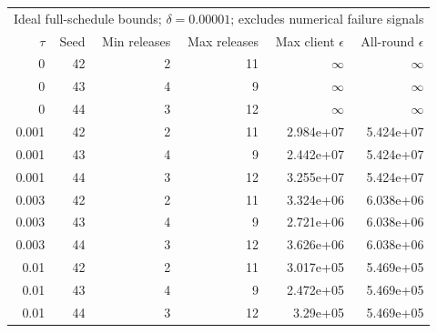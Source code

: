 \begin{tabular}{rrrrrr}
\toprule
\multicolumn{6}{l}{Ideal full-schedule bounds; $\delta=0.00001$; excludes numerical failure signals} \\
$\tau$ & Seed & Min releases & Max releases & Max client $\epsilon$ & All-round $\epsilon$ \\
\midrule
0 & 42 & 2 & 11 & $\infty$ & $\infty$ \\
0 & 43 & 4 & 9 & $\infty$ & $\infty$ \\
0 & 44 & 3 & 12 & $\infty$ & $\infty$ \\
0.001 & 42 & 2 & 11 & 2.984e+07 & 5.424e+07 \\
0.001 & 43 & 4 & 9 & 2.442e+07 & 5.424e+07 \\
0.001 & 44 & 3 & 12 & 3.255e+07 & 5.424e+07 \\
0.003 & 42 & 2 & 11 & 3.324e+06 & 6.038e+06 \\
0.003 & 43 & 4 & 9 & 2.721e+06 & 6.038e+06 \\
0.003 & 44 & 3 & 12 & 3.626e+06 & 6.038e+06 \\
0.01 & 42 & 2 & 11 & 3.017e+05 & 5.469e+05 \\
0.01 & 43 & 4 & 9 & 2.472e+05 & 5.469e+05 \\
0.01 & 44 & 3 & 12 & 3.29e+05 & 5.469e+05 \\
\bottomrule
\end{tabular}
